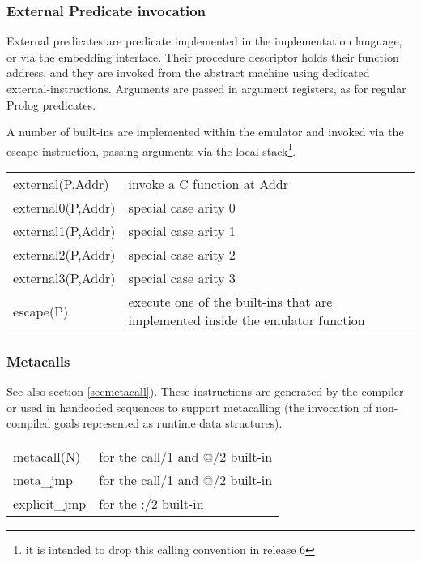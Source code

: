 \subsubsection{External Predicate invocation}
External predicates  are predicate implemented in the implementation
language, or via the embedding interface.  Their procedure descriptor
holds their function address, and they are invoked from the abstract
machine using dedicated external-instructions.
Arguments are passed in argument registers, as for regular Prolog
predicates.

A number of built-ins are implemented within the emulator and
invoked via the escape instruction, passing arguments via the
local stack\footnote{it is intended to drop this calling convention
in release 6}.

\begin{tabular}{|p{}|p{}|}
\hline
external(P,Addr)        & invoke a C function at Addr \\
external0(P,Addr)        & special case arity 0 \\
external1(P,Addr)        & special case arity 1 \\
external2(P,Addr)        & special case arity 2 \\
external3(P,Addr)        & special case arity 3 \\
escape(P)               & execute one of the built-ins
                        that are implemented inside the emulator function\\
\hline
\end{tabular}

\subsubsection{Metacalls}
See also section \ref{secmetacall}). These instructions are generated by
the compiler or used in handcoded sequences to support metacalling
(the invocation of non-compiled goals represented as runtime data structures).

\begin{tabular}{|p{}|p{}|}
\hline
metacall(N)     & for the call/1 and @/2 built-in \\
meta_jmp        & for the call/1 and @/2 built-in \\
explicit_jmp    & for the :/2 built-in \\
\hline
\end{tabular}

